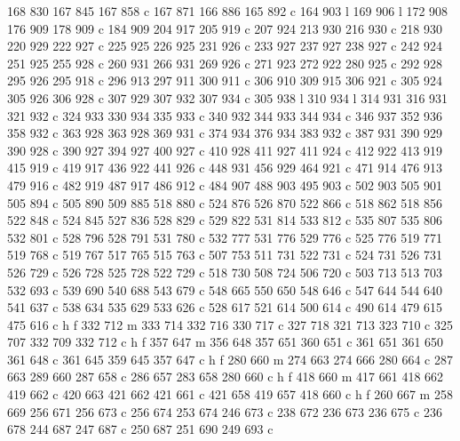 {{        168 830 167 845 167 858 c
        167 871 166 886 165 892 c
        164 903 l
        169 906 l
        172 908 176 909 178 909 c
        184 909 204 917 205 919 c
        207 924 213 930 216 930 c
        218 930 220 929 222 927 c
        225 925 226 925 231 926 c
        233 927 237 927 238 927 c
        242 924 251 925 255 928 c
        260 931 266 931 269 926 c
        271 923 272 922 280 925 c
        292 928 295 926 295 918 c
        296 913 297 911 300 911 c
        306 910 309 915 306 921 c
        305 924 305 926 306 928 c
        307 929 307 932 307 934 c
        305 938 l
        310 934 l
        314 931 316 931 321 932 c
        324 933 330 934 335 933 c
        340 932 344 933 344 934 c
        346 937 352 936 358 932 c
        363 928 363 928 369 931 c
        374 934 376 934 383 932 c
        387 931 390 929 390 928 c
        390 927 394 927 400 927 c
        410 928 411 927 411 924 c
        412 922 413 919 415 919 c
        419 917 436 922 441 926 c
        448 931 456 929 464 921 c
        471 914 476 913 479 916 c
        482 919 487 917 486 912 c
        484 907 488 903 495 903 c
        502 903 505 901 505 894 c
        505 890 509 885 518 880 c
        524 876 526 870 522 866 c
        518 862 518 856 522 848 c
        524 845 527 836 528 829 c
        529 822 531 814 533 812 c
        535 807 535 806 532 801 c
        528 796 528 791 531 780 c
        532 777 531 776 529 776 c
        525 776 519 771 519 768 c
        519 767 517 765 515 763 c
        507 753 511 731 522 731 c
        524 731 526 731 526 729 c
        526 728 525 728 522 729 c
        518 730 508 724 506 720 c
        503 713 513 703 532 693 c
        539 690 540 688 543 679 c
        548 665 550 650 548 646 c
        547 644 544 640 541 637 c
        538 634 535 629 533 626 c
        528 617 521 614 500 614 c
        490 614 479 615 475 616 c
        h f
        332 712 m
        333 714 332 716 330 717 c
        327 718 321 713 323 710 c
        325 707 332 709 332 712 c
        h f
        357 647 m
        356 648 357 651 360 651 c
        361 651 361 650 361 648 c
        361 645 359 645 357 647 c
        h f
        280 660 m
        274 663 274 666 280 664 c
        287 663 289 660 287 658 c
        286 657 283 658 280 660 c
        h f
        418 660 m
        417 661 418 662 419 662 c
        420 663 421 662 421 661 c
        421 658 419 657 418 660 c
        h f
        260 667 m
        258 669 256 671 256 673 c
        256 674 253 674 246 673 c
        238 672 236 673 236 675 c
        236 678 244 687 247 687 c
        250 687 251 690 249 693 c
}}

